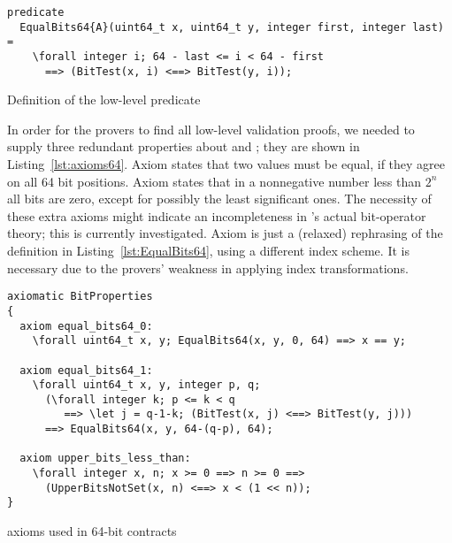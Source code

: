 \begin{listing}[hbt]
\begin{minipage}{0.99\textwidth}
\begin{lstlisting}[style=acsl-block]
predicate
  EqualBits64{A}(uint64_t x, uint64_t y, integer first, integer last) =
    \forall integer i; 64 - last <= i < 64 - first 
      ==> (BitTest(x, i) <==> BitTest(y, i));
\end{lstlisting}
\end{minipage}
\caption{\label{lst:EqualBits64}
        Definition of the low-level predicate }
\end{listing}

\FloatBarrier


In order for the provers to find all low-level validation proofs, we
needed to supply three redundant properties about
 and ; they are shown
in Listing~\ref{lst:axioms64}.
%
Axiom  states that two 
values must be equal, if they agree on all 64 bit positions.
%
Axiom  states that in a nonnegative number
less than $2^n$ all bits are zero, except for possibly
the least significant  ones.
%
The necessity of these extra axioms might indicate an
incompleteness in \framac's actual bit-operator theory; this is currently
investigated.
%
Axiom  is just a (relaxed)
rephrasing of the definition
in Listing~\ref{lst:EqualBits64}, using a different index scheme.
%
It is necessary due to the provers' weakness in applying index
transformations.


\begin{listing}[hbt]
\begin{minipage}{0.99\textwidth}
\begin{lstlisting}[style=acsl-block]
axiomatic BitProperties
{
  axiom equal_bits64_0:
    \forall uint64_t x, y; EqualBits64(x, y, 0, 64) ==> x == y;

  axiom equal_bits64_1:
    \forall uint64_t x, y, integer p, q;
      (\forall integer k; p <= k < q 
         ==> \let j = q-1-k; (BitTest(x, j) <==> BitTest(y, j)))
      ==> EqualBits64(x, y, 64-(q-p), 64);

  axiom upper_bits_less_than:
    \forall integer x, n; x >= 0 ==> n >= 0 ==>
      (UpperBitsNotSet(x, n) <==> x < (1 << n));
}
\end{lstlisting}
\end{minipage}
\caption{\label{lst:axioms64}\acsl axioms used in 64-bit contracts}
\end{listing}


